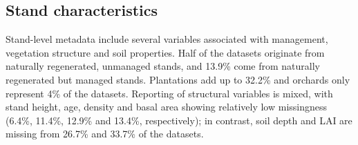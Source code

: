 \documentclass[11pt,twoside]{reedthesis}
\begin{document}
\subsection{Stand characteristics}\label{stand-characteristics}

Stand-level metadata include several variables associated with
management, vegetation structure and soil properties. Half of the
datasets originate from naturally regenerated, unmanaged stands, and
13.9\% come from naturally regenerated but managed stands. Plantations
add up to 32.2\% and orchards only represent 4\% of the datasets.
Reporting of structural variables is mixed, with stand height, age,
density and basal area showing relatively low missingness (6.4\%,
11.4\%, 12.9\% and 13.4\%, respectively); in contrast, soil depth and
LAI are missing from 26.7\% and 33.7\% of the datasets.\par
\end{document}
